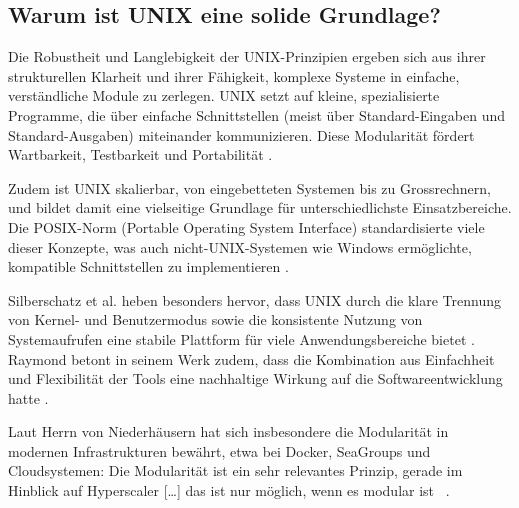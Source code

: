 \subsection{Warum ist UNIX eine solide Grundlage?}

Die Robustheit und Langlebigkeit der UNIX-Prinzipien ergeben sich aus ihrer strukturellen Klarheit und ihrer Fähigkeit, komplexe Systeme in einfache,
verständliche Module zu zerlegen. UNIX setzt auf kleine, spezialisierte Programme, die über einfache Schnittstellen (meist über Standard-Eingaben und
Standard-Ausgaben) miteinander kommunizieren. Diese Modularität fördert Wartbarkeit, Testbarkeit und Portabilität \cite{ArtOfUnixProgramming, ModernOS}.

Zudem ist UNIX skalierbar, von eingebetteten Systemen bis zu Grossrechnern, und bildet damit eine vielseitige Grundlage für unterschiedlichste Einsatzbereiche.
Die POSIX-Norm (Portable Operating System Interface) standardisierte viele dieser Konzepte, was auch nicht-UNIX-Systemen wie Windows ermöglichte, kompatible
Schnittstellen zu implementieren \cite{OSConcept}.

Silberschatz et al. heben besonders hervor, dass UNIX durch die klare Trennung von Kernel- und Benutzermodus sowie die konsistente Nutzung von Systemaufrufen eine
stabile Plattform für viele Anwendungsbereiche bietet \cite{OSConcept}. Raymond betont in seinem Werk zudem, dass die Kombination aus Einfachheit und Flexibilität
der Tools eine nachhaltige Wirkung auf die Softwareentwicklung hatte \cite{ArtOfUnixProgramming}.

Laut Herrn von Niederhäusern hat sich insbesondere die Modularität in modernen Infrastrukturen bewährt, etwa bei Docker, SeaGroups und Cloudsystemen:
\glqq Die Modularität ist ein sehr relevantes Prinzip, gerade im Hinblick auf Hyperscaler [\ldots] das ist nur möglich, wenn es modular ist\grqq
\ \cite{interviewNH}.